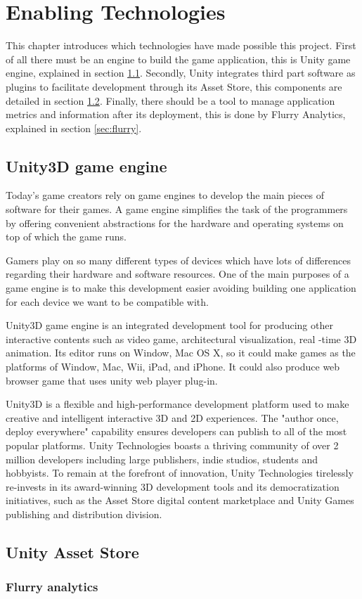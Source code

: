 
\chapter{Enabling Technologies}
\label{chap:enabling_technologies}
\begin{chapterintro}
This chapter introduces which technologies have made possible this project. First of all there must be an engine to build the game application, this is Unity game engine, explained in section \ref{sec:unity}. Secondly, Unity integrates third part software as plugins to facilitate development through its Asset Store, this components are detailed in section \ref{sec:assetstore}. Finally, there should be a tool to manage application metrics and information after its deployment, this is done by Flurry Analytics, explained in section \ref{sec:flurry}.
\end{chapterintro}

\cleardoublepage
\section{Unity3D game engine}
\label{sec:unity}
Today’s game creators rely on game engines to develop the main pieces of software for their games. A game engine simplifies the task of the programmers by offering convenient abstractions for the hardware and operating systems on top of which the game runs.~\cite{messaoudi2015dis}

Gamers play on so many different types of devices which have lots of differences regarding their hardware and software resources. One of the main purposes of a game engine is to make this development easier avoiding building one application for each device we want to be compatible with.

Unity3D game engine is an integrated development tool for producing other interactive contents such as video game, architectural visualization, real -time 3D animation. Its editor runs on Window, Mac OS X, so it could make games as the platforms of Window, Mac, Wii, iPad, and iPhone. It could also produce web browser game that uses unity web player plug-in.~\cite{kim2014dev}

Unity3D is a flexible and high-performance development platform used to make creative and intelligent interactive 3D and 2D experiences. The "author once, deploy everywhere" capability ensures developers can publish to all of the most popular platforms. Unity Technologies boasts a thriving community of over 2 million developers including large publishers, indie studios, students and hobbyists. To remain at the forefront of innovation, Unity Technologies tirelessly re-invests in its award-winning 3D development tools and its democratization initiatives, such as the Asset Store digital content marketplace and Unity Games publishing and distribution division.~\cite{unity2013press}

\section{Unity Asset Store}
\label{sec:assetstore}


\subsection{Flurry analytics}
\label{subsec:flurry}
